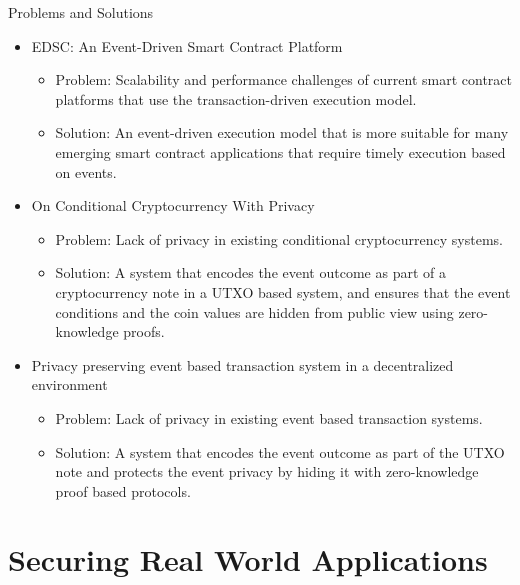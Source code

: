 \documentclass[10pt,aspectratio=169]{beamer}
\begin{document}
\begin{frame}{Problems and Solutions}
\begin{itemize}
\item EDSC: An Event-Driven Smart Contract Platform
  \begin{itemize}
    \item Problem: Scalability and performance challenges of current smart contract platforms that use the transaction-driven execution model.
    \item Solution: An event-driven execution model that is more suitable for many emerging smart contract applications that require timely execution based on events.
  \end{itemize}
\item On Conditional Cryptocurrency With Privacy
  \begin{itemize}
    \item Problem: Lack of privacy in existing conditional cryptocurrency systems.
    \item Solution: A system that encodes the event outcome as part of a cryptocurrency note in a UTXO based system, and ensures that the event conditions and the coin values are hidden from public view using zero-knowledge proofs.
  \end{itemize}
\item Privacy preserving event based transaction system in a decentralized environment
  \begin{itemize}
    \item Problem: Lack of privacy in existing event based transaction systems.
    \item Solution: A system that encodes the event outcome as part of the UTXO note and protects the event privacy by hiding it with zero-knowledge proof based protocols.
  \end{itemize}
\end{itemize}
\end{frame}

\section{Securing Real World Applications}
\end{document}

